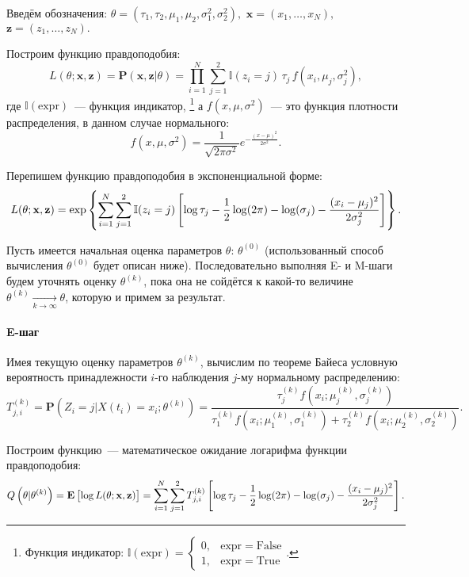 \documentclass[a4paper,10pt]{article}
\begin{document}
Введём обозначения: 
$\theta = (\tau_1, \tau_2, \mu_1, \mu_2, \sigma_1^2, \sigma_2^2),$
$\mathbf{x} = (x_1, \ldots, x_N),$
$\mathbf{z} = (z_1, \ldots, z_N).$

Построим функцию правдоподобия:
$$
L(\theta; \mathbf{x}, \mathbf{z}) = 
  \mathbf{P}(\mathbf{x}, \mathbf{z} \vert \theta) = 
  \prod\limits_{i=1}^{N} \sum\limits_{j=1}^2 
    \mathbb{I}(z_i=j) \, \tau_j \, f(x_i,\mu_j,\sigma_j^2),
$$
где $\mathbb{I}(\mathrm{expr})$~--- функция индикатор,%
\footnote{%
Функция индикатор: $\mathbb{I}(\mathrm{expr}) = \left\{
  \begin{array}{rl}
    0, & \mathrm{expr} = \mathrm{False} \\
    1, & \mathrm{expr} = \mathrm{True}
  \end{array}\right.$.
} а $f(x, \mu, \sigma^2)$~--- это функция плотности распределения, 
в данном случае нормального:
$$
  f(x, \mu, \sigma^2) = 
    \frac{1}{\sqrt{2 \pi \sigma^2}} e^{-\frac{(x - \mu)^2}{2 \sigma^2}}.
$$

Перепишем функцию правдоподобия в экспоненциальной форме:
$$
L(\theta; \mathbf{x}, \mathbf{z}) =
  \exp \cbr{ \sum\limits_{i=1}^{N} \sum\limits_{j=1}^2 
    \mathbb{I}(z_i=j) \sbr{
      \log \tau_j - 
      \frac{1}{2}\log(2\pi) -
      \log(\sigma_j) -
      \frac{(x_i - \mu_j)^2}{2 \sigma_j^2}}}.
$$

Пусть имеется начальная оценка параметров $\theta$: $\theta^{(0)}$ 
(использованный способ вычисления $\theta^{(0)}$ будет описан ниже).
Последовательно выполняя E- и M-шаги будем уточнять оценку $\theta^{(k)}$,
пока она не сойдётся к какой-то величине 
$\theta^{(k)} \xrightarrow[k \rightarrow \infty]{} \theta$, 
которую и примем за результат.

\paragraph*{E-шаг}%
Имея текущую оценку параметров $\theta^{(k)}$, вычислим по теореме Байеса 
условную вероятность принадлежности $i$-го наблюдения $j$-му нормальному 
распределению:
$$
T_{j,i}^{(k)} = \mathbf{P}(Z_i = j \vert X(t_i) = x_i; \theta^{(k)}) =
  \frac{\tau_j^{(k)} f(x_i; \mu_j^{(k)}, \sigma_j^{(k)})}
       {\tau_1^{(k)} f(x_i; \mu_1^{(k)}, \sigma_1^{(k)}) + 
       {\tau_2^{(k)} f(x_i; \mu_2^{(k)}, \sigma_2^{(k)})}}.
$$

Построим функцию~--- математическое ожидание логарифма функции правдоподобия:
$$
Q\del{\theta \vert \theta^{(k)}} = 
  \mathbf{E}\sbr{\log L(\theta; \mathbf{x}, \mathbf{z})} =
  \sum\limits_{i=1}^{N} \sum\limits_{j=1}^2
    T_{j,i}^{(k)} 
      \sbr{
        \log \tau_j - 
        \frac{1}{2}\log(2\pi) -
        \log(\sigma_j) -
        \frac{(x_i - \mu_j)^2}{2 \sigma_j^2}
      }.
$$
\end{document}
